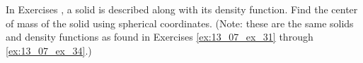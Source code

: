 {\noindent In Exercises} 
{,  a solid is described along with its density function. Find the center of mass of the solid using  spherical coordinates. (Note: these are the same solids and density functions as found in Exercises \ref{ex:13_07_ex_31} through \ref{ex:13_07_ex_34}.) 
}
